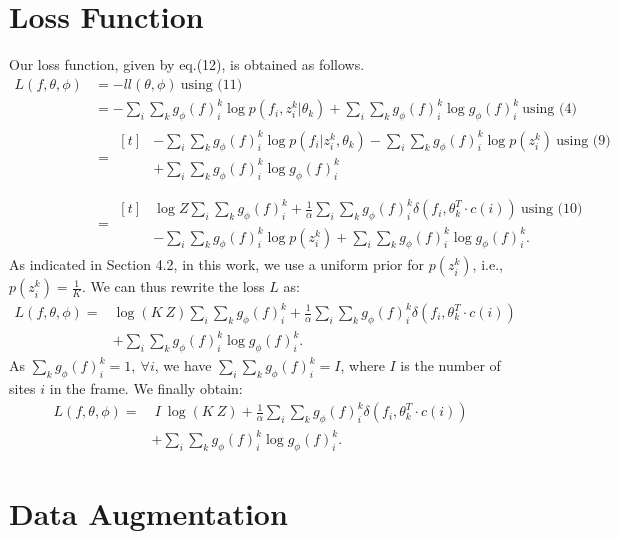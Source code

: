 \documentclass[10pt,twocolumn,letterpaper]{article}
\begin{document}
\section{Loss Function}
Our loss function, given by eq.(12), is obtained as follows.
\begin{align*}
L(f, \theta, \phi) &= - ll(\theta, \phi) \ \mbox{using (11)}\\
&= -  \sum_i \sum_k  g_\phi(f)_i^k  \log p(f_i, z_i^k | \theta_k) + \sum_i \sum_k  g_\phi(f)_i^k \log g_\phi(f)_i^k \ \mbox{using (4)}\\
&= 
\begin{aligned}[t]
&-  \sum_i \sum_k  g_\phi(f)_i^k  \log p(f_i |  z_i^k , \theta_k) -  \sum_i \sum_k  g_\phi(f)_i^k  \log p( z_i^k) \  \mbox{using (9)}\\
&+ \sum_i \sum_k  g_\phi(f)_i^k \log g_\phi(f)_i^k\\
\end{aligned}\\
&=  
\begin{aligned}[t]
&\log Z \sum_i \sum_k  g_\phi(f)_i^k +  \frac{1}{\alpha}\sum_i \sum_k  g_\phi(f)_i^k  \delta(f_i, \theta^T_k \cdot c(i)) \ \mbox{using (10)}\\
&-  \sum_i \sum_k  g_\phi(f)_i^k  \log p( z_i^k) + \sum_i \sum_k  g_\phi(f)_i^k \log g_\phi(f)_i^k.
\end{aligned}
\end{align*}
As indicated in Section 4.2, in this work, we use a uniform prior for $p(z_i^k )$, i.e., $p(z_i^k )=\frac{1}{K}$. We can thus rewrite the loss $L$ as:
\begin{align*}
L(f, \theta, \phi) = &\log (K \ Z) \sum_i \sum_k  g_\phi(f)_i^k +  \frac{1}{\alpha}\sum_i \sum_k  g_\phi(f)_i^k  \delta(f_i, \theta^T_k \cdot c(i)) \\
&+ \sum_i \sum_k  g_\phi(f)_i^k \log g_\phi(f)_i^k.
\end{align*}
As $\sum_k  g_\phi(f)_i^k = 1, \ \forall i$, we have $\sum_i \sum_k  g_\phi(f)_i^k=I$, where $I$ is the number of sites $i$ in the frame. We finally obtain: 
\begin{align*}
L(f, \theta, \phi) =& \ I \ \log (K \ Z) +  \frac{1}{\alpha}\sum_i \sum_k  g_\phi(f)_i^k  \delta(f_i, \theta^T_k \cdot c(i))\\
&+ \sum_i \sum_k  g_\phi(f)_i^k \log g_\phi(f)_i^k.
\end{align*}

\section{Data Augmentation}
\end{document}
